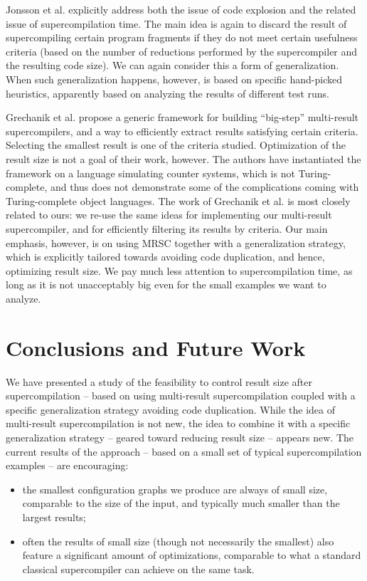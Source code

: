 \documentclass[submission,copyright,creativecommons]{eptcs}
\begin{document}
Jonsson et al. \cite{Jonsson2011Taming} explicitly address both the issue of code explosion and
the related issue of supercompilation time.
The main idea is again to discard the result of supercompiling certain program fragments
if they do not meet certain usefulness criteria (based on the number of reductions performed 
by the supercompiler and the resulting code size).
We can again consider this a form of generalization.
When such generalization happens, however, is based on specific hand-picked heuristics,
apparently based on analyzing the results of different test runs.

Grechanik et al. \cite{Romanenko2014StagedMRSC} propose a generic framework for building ``big-step''
multi-result supercompilers, and a way to efficiently extract results satisfying certain criteria.
Selecting the smallest result is one of the criteria studied.
Optimization of the result size is not a goal of their work, however.
The authors have instantiated the framework on a language simulating counter systems, which
is not Turing-complete, and thus does not demonstrate some of the complications
coming with Turing-complete object languages.
The work of Grechanik et al. \cite{Romanenko2014StagedMRSC} is most closely related to ours: 
we re-use the same ideas for implementing
our multi-result supercompiler, and for efficiently filtering its results by criteria.
Our main emphasis, however, is on using MRSC together with a generalization strategy, which
is explicitly tailored towards avoiding code duplication, and hence, optimizing result size.
We pay much less attention to supercompilation time, as long as it is not unacceptably big
even for the small examples we want to analyze.

\section{Conclusions and Future Work}

We have presented a study of the feasibility to control result size after supercompilation
-- based on using multi-result supercompilation coupled with a specific generalization
strategy avoiding code duplication.
While the idea of multi-result supercompilation is not new, the idea to combine it
with a specific generalization strategy -- geared toward reducing result size --
appears new.
The current results of the approach -- based on a small set of typical supercompilation examples --
are encouraging:
\begin{itemize}
  \item the smallest configuration graphs we produce are always of small size, comparable
    to the size of the input, and typically much smaller than the largest results;
  \item often the results of small size (though not necessarily the smallest) also feature a
    significant amount of optimizations, comparable to what a standard classical supercompiler
    can achieve on the same task.
\end{itemize}
\end{document}
